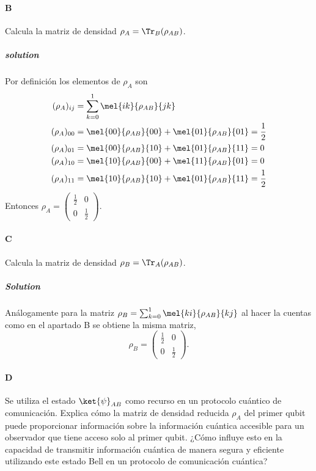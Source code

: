 \paragraph{B} Calcula la matriz de densidad $\rho_A = \Tr_B(\rho_{AB})$.
\subparagraph{solution}
Por definición los elementos de $\rho_A$ son
	\begin{equation*}
\begin{split}
		(\rho_A)_{ij}&=\sum_{k=0}^1 \mel{ik}{\rho_{AB}}{jk}\\
		(\rho_A)_{00}&=\mel{00}{\rho_{AB}}{00}+\mel{01}{\rho_{AB}}{01}=\frac{1}{2}\\
		(\rho_A)_{01}&=\mel{00}{\rho_{AB}}{10}+\mel{01}{\rho_{AB}}{11}=0\\
		(\rho_A)_{10}&=\mel{10}{\rho_{AB}}{00}+\mel{11}{\rho_{AB}}{01}=0\\
		(\rho_A)_{11}&=\mel{10}{\rho_{AB}}{10}+\mel{01}{\rho_{AB}}{11}=\frac{1}{2}\\
\end{split}
	\end{equation*}
	Entonces $\rho_{A}=\begin{pmatrix}\frac{1}{2} & 0 \\ 0 & \frac{1}{2} \end{pmatrix}$.

\paragraph{C} Calcula la matriz de densidad $\rho_B = \Tr_A(\rho_{AB})$.

\subparagraph{Solution}
	Análogamente para la matriz $\rho_B=\sum_{k=0}^1 \mel{ki}{\rho_{AB}}{kj}$ al hacer la cuentas como en el apartado B se obtiene la misma matriz,
\[
	\rho_{B}=\begin{pmatrix}\frac{1}{2} & 0 \\ 0 & \frac{1}{2} \end{pmatrix}.
\]


\paragraph{D} Se utiliza el estado $\ket{\psi}_{AB}$ como recurso en un protocolo cuántico de comunicación.
Explica cómo la matriz de densidad reducida $\rho_A$ del primer qubit puede proporcionar información sobre la información cuántica accesible para un observador que tiene acceso solo al primer qubit.
¿Cómo influye esto en la capacidad de transmitir información cuántica de manera segura y eficiente utilizando este estado Bell en un protocolo de comunicación cuántica?

